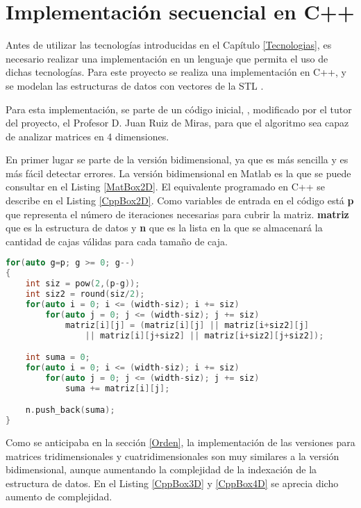 \chapter{Implementación secuencial en C++}
\label{Secuencial}
Antes de utilizar las tecnologías introducidas en el Capítulo \ref{Tecnologias}, es necesario realizar una implementación en un lenguaje que permita el uso de dichas tecnologías. Para este proyecto se realiza una implementación en C++, y se modelan las estructuras de datos con vectores de la STL \cite{unknown-author-no-dateH}.

Para esta implementación, se parte de un código inicial, \cite{unknown-author-2008}, modificado por el tutor del proyecto, el Profesor D. Juan Ruiz de Miras, para que el algoritmo sea capaz de analizar matrices en 4 dimensiones.



En primer lugar se parte de la versión bidimensional, ya que es más sencilla y es más fácil detectar errores. La versión bidimensional en Matlab es la que se puede consultar en el Listing \ref{MatBox2D}. El equivalente programado en C++ se describe en el Listing \ref{CppBox2D}. Como variables de entrada en el código está \textbf{p} que representa el número de iteraciones necesarias para cubrir la matriz. \textbf{matriz} que es la estructura de datos y \textbf{n} que es la lista en la que se almacenará la cantidad de cajas válidas para cada tamaño de caja.
\newpage
\begin{lstlisting}[language=C++,caption={Primera versión del Boxcount2D programado en C++},label=CppBox2D,basicstyle=\tiny]
for(auto g=p; g >= 0; g--)
{
    int siz = pow(2,(p-g));
    int siz2 = round(siz/2);
    for(auto i = 0; i <= (width-siz); i += siz)
        for(auto j = 0; j <= (width-siz); j += siz)
            matriz[i][j] = (matriz[i][j] || matriz[i+siz2][j] 
                || matriz[i][j+siz2] || matriz[i+siz2][j+siz2]);

    int suma = 0; 
    for(auto i = 0; i <= (width-siz); i += siz)
        for(auto j = 0; j <= (width-siz); j += siz)
            suma += matriz[i][j];

    n.push_back(suma);
}
\end{lstlisting}

Como se anticipaba en la sección \ref{Orden}, la implementación de las versiones para matrices tridimensionales y cuatridimensionales son muy similares a la versión bidimensional, aunque aumentando la complejidad de la indexación de la estructura de datos. En el Listing \ref{CppBox3D} y \ref{CppBox4D} se aprecia dicho aumento de complejidad.

